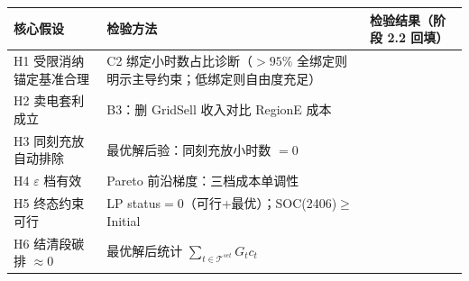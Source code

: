 \documentclass{internal-report}
\begin{document}
\begin{center}
\footnotesize
\begin{tabular}{lll}
\toprule
核心假设 & 检验方法 & 检验结果（阶段 2.2 回填） \\
\midrule
H1 受限消纳锚定基准合理 & C2 绑定小时数占比诊断（$>95\%$ 全绑定则明示主导约束；低绑定则自由度充足） & \\
H2 卖电套利成立 & B3：删 GridSell 收入对比 RegionE 成本 & \\
H3 同刻充放自动排除 & 最优解后验：同刻充放小时数 $=0$ & \\
H4 $\varepsilon$ 档有效 & Pareto 前沿梯度：三档成本单调性 & \\
H5 终态约束可行 & LP status$=0$（可行+最优）；SOC(2406)$\ge$Initial & \\
H6 结清段碳排 $\approx 0$ & 最优解后统计 $\sum_{t\in\mathcal{T}^{set}} G_t c_t$ & \\
\bottomrule
\end{tabular}
\end{center}
\end{document}
